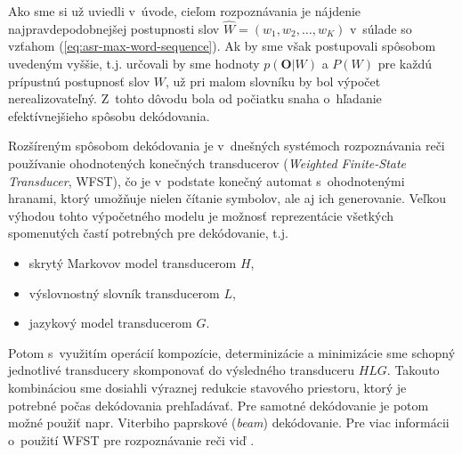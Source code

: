 Ako sme si už uviedli v~úvode, cieľom rozpoznávania je nájdenie najpravdepodobnejšej postupnosti slov $\hat{W} = (w_1, w_2, \dots, w_K)$ v~súlade so vzťahom (\ref{eq:asr-max-word-sequence}). Ak by sme však postupovali spôsobom uvedeným vyššie, t.j. určovali by sme hodnoty $p(\bm{O}|W)$ a $P(W)$ pre každú prípustnú postupnosť slov $W$, už pri malom slovníku by bol výpočet nerealizovateľný.
Z~tohto dôvodu bola od počiatku snaha o~hľadanie efektívnejšieho spôsobu dekódovania. 

Rozšíreným spôsobom dekódovania je v~dnešných systémoch rozpoznávania reči používanie ohodnotených konečných transducerov (\textit{Weighted Finite-State Transducer}, WFST), čo je v~podstate konečný automat s~ohodnotenými hranami, ktorý umožňuje nielen čítanie symbolov, ale aj ich generovanie. Veľkou výhodou tohto výpočetného modelu je možnosť reprezentácie všetkých spomenutých častí potrebných pre dekódovanie, t.j. 

\begin{itemize}
    \item skrytý Markovov model transducerom $H$,
    \item výslovnostný slovník transducerom $L$,
    \item jazykový model transducerom $G$.
\end{itemize}

\noindent Potom s~využitím operácií kompozície, determinizácie a minimizácie sme schopný jednotlivé transducery skomponovať do výsledného transduceru $\textit{HLG}$. Takouto kombináciou sme dosiahli výraznej redukcie stavového priestoru, ktorý je potrebné počas dekódovania prehľadávať. Pre samotné dekódovanie je potom možné použiť napr. Viterbiho paprskové (\textit{beam}) dekódovanie. Pre viac informácii o~použití WFST pre rozpoznávanie reči viď \cite{WFST}.
